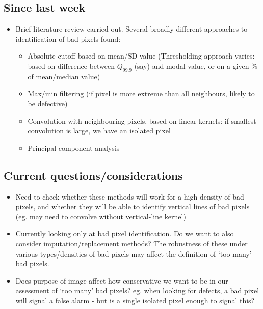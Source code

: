 \documentclass[10pt,fleqn]{article}
\begin{document}
\subsection*{Since last week}

\begin{itemize}

\item
Brief literature review carried out. Several broadly different approaches to identification of bad pixels found:

\begin{itemize}

\item Absolute cutoff based on mean/SD value (Thresholding approach varies: based on difference between $Q_{99.9}$ (say) and modal value, or on a given \% of mean/median value)

\item Max/min filtering (if pixel is more extreme than all neighbours, likely to be defective)

\item Convolution with neighbouring pixels, based on linear kernels: if smallest convolution is large, we have an isolated pixel

\item Principal component analysis

\end{itemize}

\end{itemize}

\subsection*{Current questions/considerations}
\begin{itemize}

\item Need to check whether these methods will work for a high density of bad pixels, and whether they will be able to identify vertical lines of bad pixels (eg. may need to convolve without vertical-line kernel)

\item Currently looking only at bad pixel identification. Do we want to also consider imputation/replacement methods? The robustness of these under various types/densities of bad pixels may affect the definition of `too many' bad pixels.

\item Does purpose of image affect how conservative we want to be in our assessment of `too many' bad pixels? eg. when looking for defects, a bad pixel will signal a false alarm - but is a single isolated pixel enough to signal this?

\end{itemize}
\end{document}
